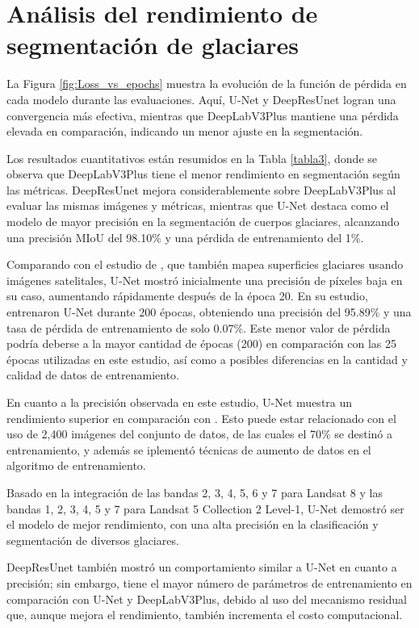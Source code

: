\section{Análisis del rendimiento de segmentación de glaciares}

La Figura \ref{fig:Loss_vs_epochs} muestra la evolución de la función de pérdida en cada modelo durante las evaluaciones. Aquí, U-Net y DeepResUnet logran una convergencia más efectiva, mientras que DeepLabV3Plus mantiene una pérdida elevada en comparación, indicando un menor ajuste en la segmentación.

Los resultados cuantitativos están resumidos en la Tabla \ref{tabla3}, donde se observa que DeepLabV3Plus tiene el menor rendimiento en segmentación según las métricas. DeepResUnet mejora considerablemente sobre DeepLabV3Plus al evaluar las mismas imágenes y métricas, mientras que U-Net destaca como el modelo de mayor precisión en la segmentación de cuerpos glaciares, alcanzando una precisión MIoU del 98.10\% y una pérdida de entrenamiento del 1\%.

Comparando con el estudio de \parencite{rajat2022glacier}, que también mapea superficies glaciares usando imágenes satelitales, U-Net mostró inicialmente una precisión de píxeles baja en su caso, aumentando rápidamente después de la época 20. En su estudio, entrenaron U-Net durante 200 épocas, obteniendo una precisión del 95.89\% y una tasa de pérdida de entrenamiento de solo 0.07\%. Este menor valor de pérdida podría deberse a la mayor cantidad de épocas (200) en comparación con las 25 épocas utilizadas en este estudio, así como a posibles diferencias en la cantidad y calidad de datos de entrenamiento.

En cuanto a la precisión observada en este estudio, U-Net muestra un rendimiento superior en comparación con \parencite{rajat2022glacier}. Esto puede estar relacionado con el uso de 2,400 imágenes del conjunto de datos, de las cuales el 70\% se destinó a entrenamiento, y  además se iplementó técnicas de aumento de datos en el algoritmo de entrenamiento.

Basado en la integración de las bandas 2, 3, 4, 5, 6 y 7 para Landsat 8 y las bandas 1, 2, 3, 4, 5 y 7 para Landsat 5 Collection 2 Level-1, U-Net demostró ser el modelo de mejor rendimiento, con una alta precisión en la clasificación y segmentación de diversos glaciares.

DeepResUnet también mostró un comportamiento similar a U-Net en cuanto a precisión; sin embargo, tiene el mayor número de parámetros de entrenamiento en comparación con U-Net y DeepLabV3Plus, debido al uso del mecanismo residual que, aunque mejora el rendimiento, también incrementa el costo computacional.



